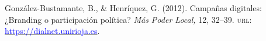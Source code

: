 \begin{publications}
\begin{benumerate}{14}

\item{González-Bustamante, B., \& Henríquez, G. (2012). Campañas digitales: ¿Branding o participación política? {\itshape Más Poder Local,} 12, 32--39. {\scshape url:} \href{https://dialnet.unirioja.es/servlet/articulo?codigo=4013864}{\textcolor{blue}{https://dialnet.unirioja.es}}.} \vspace{1mm} %

\end{benumerate}

\end{publications}
\pagebreak